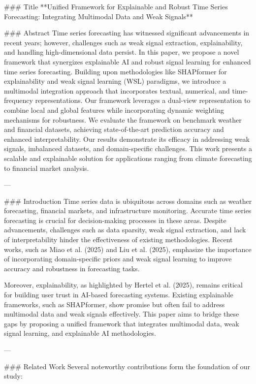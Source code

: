 ### Title  
**Unified Framework for Explainable and Robust Time Series Forecasting: Integrating Multimodal Data and Weak Signals**

### Abstract  
Time series forecasting has witnessed significant advancements in recent years; however, challenges such as weak signal extraction, explainability, and handling high-dimensional data persist. In this paper, we propose a novel framework that synergizes explainable AI and robust signal learning for enhanced time series forecasting. Building upon methodologies like SHAPformer for explainability and weak signal learning (WSL) paradigms, we introduce a multimodal integration approach that incorporates textual, numerical, and time-frequency representations. Our framework leverages a dual-view representation to combine local and global features while incorporating dynamic weighting mechanisms for robustness. We evaluate the framework on benchmark weather and financial datasets, achieving state-of-the-art prediction accuracy and enhanced interpretability. Our results demonstrate its efficacy in addressing weak signals, imbalanced datasets, and domain-specific challenges. This work presents a scalable and explainable solution for applications ranging from climate forecasting to financial market analysis.

---

### Introduction  
Time series data is ubiquitous across domains such as weather forecasting, financial markets, and infrastructure monitoring. Accurate time series forecasting is crucial for decision-making processes in these areas. Despite advancements, challenges such as data sparsity, weak signal extraction, and lack of interpretability hinder the effectiveness of existing methodologies. Recent works, such as Miao et al. (2025) and Liu et al. (2025), emphasize the importance of incorporating domain-specific priors and weak signal learning to improve accuracy and robustness in forecasting tasks.  

Moreover, explainability, as highlighted by Hertel et al. (2025), remains critical for building user trust in AI-based forecasting systems. Existing explainable frameworks, such as SHAPformer, show promise but often fail to address multimodal data and weak signals effectively. This paper aims to bridge these gaps by proposing a unified framework that integrates multimodal data, weak signal learning, and explainable AI methodologies.

---

### Related Work  
Several noteworthy contributions form the foundation of our study:

